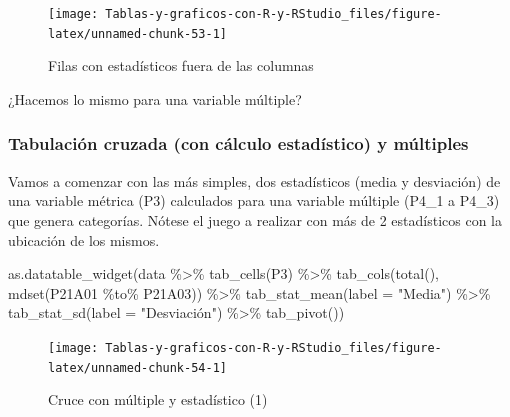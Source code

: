 \documentclass[
]{book}
\newenvironment{Shaded}{\begin{snugshade}}{\end{snugshade}}
\newcommand{\AttributeTok}[1]{\textcolor[rgb]{0.77,0.63,0.00}{#1}}
\newcommand{\FunctionTok}[1]{\textcolor[rgb]{0.00,0.00,0.00}{#1}}
\newcommand{\NormalTok}[1]{#1}
\newcommand{\SpecialCharTok}[1]{\textcolor[rgb]{0.00,0.00,0.00}{#1}}
\newcommand{\StringTok}[1]{\textcolor[rgb]{0.31,0.60,0.02}{#1}}
\begin{document}
\begin{figure}[H]

{\centering \texttt{[image: Tablas-y-graficos-con-R-y-RStudio\_files/figure-latex/unnamed-chunk-53-1]} 

}

\caption{Filas con estadísticos fuera de las columnas}\label{fig:unnamed-chunk-53}
\end{figure}

¿Hacemos lo mismo para una variable múltiple?

\hypertarget{tabulaciuxf3n-cruzada-con-cuxe1lculo-estaduxedstico-y-muxfaltiples}{%
\subsubsection{Tabulación cruzada (con cálculo estadístico) y múltiples}\label{tabulaciuxf3n-cruzada-con-cuxe1lculo-estaduxedstico-y-muxfaltiples}}

Vamos a comenzar con las más simples, dos estadísticos (media y desviación) de una variable métrica (P3) calculados para una variable múltiple (P4\_1 a P4\_3) que genera categorías. Nótese el juego a realizar con más de 2 estadísticos con la ubicación de los mismos.

\begin{Shaded}
\begin{Highlighting}[]
\FunctionTok{as.datatable\_widget}\NormalTok{(data }\SpecialCharTok{\%\textgreater{}\%}
  \FunctionTok{tab\_cells}\NormalTok{(P3) }\SpecialCharTok{\%\textgreater{}\%}
  \FunctionTok{tab\_cols}\NormalTok{(}\FunctionTok{total}\NormalTok{(), }\FunctionTok{mdset}\NormalTok{(P21A01 }\SpecialCharTok{\%to\%}\NormalTok{ P21A03)) }\SpecialCharTok{\%\textgreater{}\%}
  \FunctionTok{tab\_stat\_mean}\NormalTok{(}\AttributeTok{label =} \StringTok{"Media"}\NormalTok{) }\SpecialCharTok{\%\textgreater{}\%}
  \FunctionTok{tab\_stat\_sd}\NormalTok{(}\AttributeTok{label =} \StringTok{"Desviación"}\NormalTok{) }\SpecialCharTok{\%\textgreater{}\%}
  \FunctionTok{tab\_pivot}\NormalTok{())}
\end{Highlighting}
\end{Shaded}

\begin{figure}[H]

{\centering \texttt{[image: Tablas-y-graficos-con-R-y-RStudio\_files/figure-latex/unnamed-chunk-54-1]} 

}

\caption{Cruce con múltiple y estadístico (1)}\label{fig:unnamed-chunk-54}
\end{figure}
\end{document}
